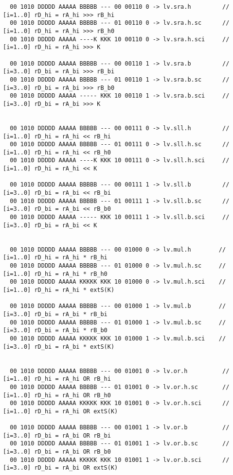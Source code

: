 \begin{landscape}
\begin{verbatim}
  00 1010 DDDDD AAAAA BBBBB --- 00 00110 0 -> lv.sra.h         // [i=1..0] rD_hi = rA_hi >>> rB_hi
  00 1010 DDDDD AAAAA BBBBB --- 01 00110 0 -> lv.sra.h.sc      // [i=1..0] rD_hi = rA_hi >>> rB_h0
  00 1010 DDDDD AAAAA ----K KKK 10 00110 0 -> lv.sra.h.sci     // [i=1..0] rD_hi = rA_hi >>> K

  00 1010 DDDDD AAAAA BBBBB --- 00 00110 1 -> lv.sra.b         // [i=3..0] rD_bi = rA_bi >>> rB_bi
  00 1010 DDDDD AAAAA BBBBB --- 01 00110 1 -> lv.sra.b.sc      // [i=3..0] rD_bi = rA_bi >>> rB_b0
  00 1010 DDDDD AAAAA ----- KKK 10 00110 1 -> lv.sra.b.sci     // [i=3..0] rD_bi = rA_bi >>> K


  00 1010 DDDDD AAAAA BBBBB --- 00 00111 0 -> lv.sll.h         // [i=1..0] rD_hi = rA_hi << rB_hi
  00 1010 DDDDD AAAAA BBBBB --- 01 00111 0 -> lv.sll.h.sc      // [i=1..0] rD_hi = rA_hi << rB_h0
  00 1010 DDDDD AAAAA ----K KKK 10 00111 0 -> lv.sll.h.sci     // [i=1..0] rD_hi = rA_hi << K

  00 1010 DDDDD AAAAA BBBBB --- 00 00111 1 -> lv.sll.b         // [i=3..0] rD_bi = rA_bi << rB_bi
  00 1010 DDDDD AAAAA BBBBB --- 01 00111 1 -> lv.sll.b.sc      // [i=3..0] rD_bi = rA_bi << rB_b0
  00 1010 DDDDD AAAAA ----- KKK 10 00111 1 -> lv.sll.b.sci     // [i=3..0] rD_bi = rA_bi << K


  00 1010 DDDDD AAAAA BBBBB --- 00 01000 0 -> lv.mul.h        // [i=1..0] rD_hi = rA_hi * rB_hi
  00 1010 DDDDD AAAAA BBBBB --- 01 01000 0 -> lv.mul.h.sc     // [i=1..0] rD_hi = rA_hi * rB_h0
  00 1010 DDDDD AAAAA KKKKK KKK 10 01000 0 -> lv.mul.h.sci    // [i=1..0] rD_hi = rA_hi * extS(K)

  00 1010 DDDDD AAAAA BBBBB --- 00 01000 1 -> lv.mul.b        // [i=3..0] rD_bi = rA_bi * rB_bi
  00 1010 DDDDD AAAAA BBBBB --- 01 01000 1 -> lv.mul.b.sc     // [i=3..0] rD_bi = rA_bi * rB_b0
  00 1010 DDDDD AAAAA KKKKK KKK 10 01000 1 -> lv.mul.b.sci    // [i=3..0] rD_bi = rA_bi * extS(K)


  00 1010 DDDDD AAAAA BBBBB --- 00 01001 0 -> lv.or.h          // [i=1..0] rD_hi = rA_hi OR rB_hi
  00 1010 DDDDD AAAAA BBBBB --- 01 01001 0 -> lv.or.h.sc       // [i=1..0] rD_hi = rA_hi OR rB_h0
  00 1010 DDDDD AAAAA KKKKK KKK 10 01001 0 -> lv.or.h.sci      // [i=1..0] rD_hi = rA_hi OR extS(K)

  00 1010 DDDDD AAAAA BBBBB --- 00 01001 1 -> lv.or.b          // [i=3..0] rD_bi = rA_bi OR rB_bi
  00 1010 DDDDD AAAAA BBBBB --- 01 01001 1 -> lv.or.b.sc       // [i=3..0] rD_bi = rA_bi OR rB_b0
  00 1010 DDDDD AAAAA KKKKK KKK 10 01001 1 -> lv.or.b.sci      // [i=3..0] rD_bi = rA_bi OR extS(K)



\end{verbatim}
\end{landscape}
